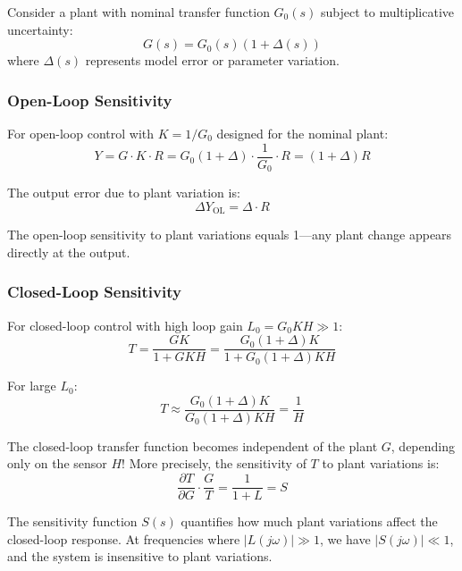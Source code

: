 Consider a plant with nominal transfer function $G_0(s)$ subject to multiplicative uncertainty:
\begin{equation}
G(s) = G_0(s)(1 + \Delta(s))
\label{eq:uncertain_plant}
\end{equation}
where $\Delta(s)$ represents model error or parameter variation.

\subsubsection{Open-Loop Sensitivity}

For open-loop control with $K = 1/G_0$ designed for the nominal plant:
\begin{equation}
Y = G \cdot K \cdot R = G_0(1+\Delta) \cdot \frac{1}{G_0} \cdot R = (1+\Delta) R
\end{equation}

The output error due to plant variation is:
\begin{equation}
\Delta Y_{\text{OL}} = \Delta \cdot R
\label{eq:openloop_sensitivity}
\end{equation}

The open-loop sensitivity to plant variations equals 1---any plant change appears directly at the output.

\subsubsection{Closed-Loop Sensitivity}

For closed-loop control with high loop gain $L_0 = G_0 K H \gg 1$:
\begin{equation}
T = \frac{G K}{1 + G K H} = \frac{G_0(1+\Delta)K}{1 + G_0(1+\Delta)K H}
\end{equation}

For large $L_0$:
\begin{equation}
T \approx \frac{G_0(1+\Delta)K}{G_0(1+\Delta)K H} = \frac{1}{H}
\end{equation}

The closed-loop transfer function becomes independent of the plant $G$, depending only on the sensor $H$! More precisely, the sensitivity of $T$ to plant variations is:
\begin{equation}
\frac{\partial T}{\partial G} \cdot \frac{G}{T} = \frac{1}{1 + L} = S
\label{eq:closedloop_sensitivity}
\end{equation}

The sensitivity function $S(s)$ quantifies how much plant variations affect the closed-loop response. At frequencies where $|L(j\omega)| \gg 1$, we have $|S(j\omega)| \ll 1$, and the system is insensitive to plant variations.


